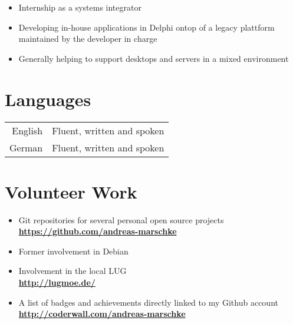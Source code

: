 \documentclass[12pt]{article}
\begin{document}
\begin{itemize}
  \item[] Internship as a systems integrator
  \item[] Developing in-house applications in Delphi ontop of a
    legacy plattform maintained by the developer in charge 
  \item[] Generally helping to support desktops and servers in a
    mixed environment
\end{itemize}

\section*{Languages}

\begin{tabular}{@{} r @{ : } l @{}}
  English & Fluent, written and spoken \\
  German  & Fluent, written and spoken \\
\end{tabular}

\section*{Volunteer Work}
\begin{itemize}
  \item[] Git repositories for several personal open source projects \\
	   \textbf{\url{https://github.com/andreas-marschke}}
  \item[] Former involvement in Debian
  \item[] Involvement in the local LUG \\
  	   \textbf{\url{http://lugmoe.de/}}
  \item[] A list of badges and achievements directly linked to my Github account \\
	   \textbf{\url{http://coderwall.com/andreas-marschke}}

	
\end{itemize}
\end{document}
